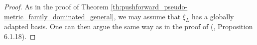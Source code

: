 \documentclass [11pt,reqno]{amsart}
\newcommand{\1}{\mathmybb{1}}
\def\cE{{\mathcal{E}}}
\def\cL{{\mathcal{L}}}
\def\cX{{\mathcal{X}}}
\begin{document}
\begin{proof}
As in the proof of Theorem \ref{th:pushforward_pseudo-metric_family_dominated_general}, we may assume that $\xi_{L}$ has a globally adapted basis. One can then argue the same way as in the proof of (\cite{ChenMori}, Proposition 6.1.18).

\end{proof}
\end{document}
